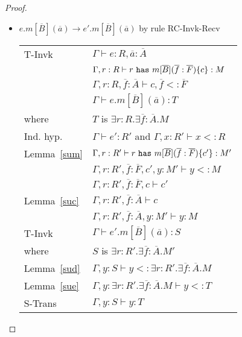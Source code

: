 \begin{proof}
\begin{itemize}
\item $e.m[\overline{B}](\overline{a}) \rightarrow e'.m[\overline{B}](\overline{a})$ by rule {\sc RC-Invk-Recv}
\\
\begin{tabular}{ll}
{\sc T-Invk} & $\Gamma\vdash e:R,\overline{a}:\overline{A}$
\\
& $\Gamma,r:R\vdash r~{\tt has}~m[\overline{B}](\overline{f}:\overline{F})\{c\}:M$
\\
& $\Gamma,r:R,\overline{f}:\overline{A}\vdash c,\overline{f}<:\overline{F}$
\\
& $\Gamma\vdash e.m[\overline{B}](\overline{a}):T$
\\
where & $T$ is $\exists r:R.\exists \overline{f}:\overline{A}.M$
\\
Ind. hyp. & $\Gamma\vdash e':R'$ and $\Gamma,x:R'\vdash x<:R$
\\
Lemma~\ref{sum} & $\Gamma,r:R'\vdash r~{\tt has}~m[\overline{B}](\overline{f}:\overline{F})\{c'\}:M'$
\\
& $\Gamma,r:R',\overline{f}:\overline{F},c',y:M'\vdash y<:M$
\\
& $\Gamma,r:R',\overline{f}:\overline{F},c\vdash c'$
\\
Lemma~\ref{suc} & $\Gamma,r:R',\overline{f}:\overline{A}\vdash c$
\\
& $\Gamma,r:R',\overline{f}:\overline{A},y:M'\vdash y:M$
\\
{\sc T-Invk} & $\Gamma\vdash e'.m[\overline{B}](\overline{a}):S$
\\
where & $S$ is $\exists r:R'.\exists \overline{f}:\overline{A}.M'$
\\
Lemma~\ref{sud} & $\Gamma,y:S\vdash y<:\exists r:R'.\exists\overline{f}:\overline{A}.M$
\\
Lemma~\ref{sue} & $\Gamma,y:\exists r:R'.\exists\overline{f}:\overline{A}.M\vdash y<:T$
\\
{\sc S-Trans} & $\Gamma, y:S\vdash y:T$
\end{tabular}



\end{itemize}
\end{proof}

